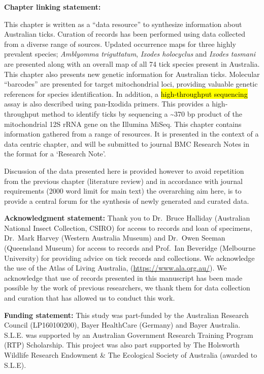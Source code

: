 \documentclass[a4paper, nobind]{templates/ociamthesis}
\begin{document}
\newpage

\textbf{Chapter linking statement:}

This chapter is written as a ``data resource'' to synthesize information about Australian ticks.
Curation of records has been performed using data collected from a diverse range of sources.
Updated occurrence maps for three highly prevalent species; \emph{Amblyomma triguttatum}, \emph{Ixodes holocyclus} and \emph{Ixodes tasmani} are presented along with an overall map of all 74 tick species present in Australia. This chapter also presents new genetic information for Australian ticks.
Molecular ``barcodes'' are presented for target mitochondrial loci, providing valuable genetic references for species identification. In addition, a \hl{high-throughput sequencing} assay is also described using pan-Ixodida primers.
This provides a high-throughput method to identify ticks by sequencing a \textasciitilde370 bp product of the mitochondrial 12S rRNA gene on the Illumina MiSeq.
This chapter contains information gathered from a range of resources.
It is presented in the context of a data centric chapter, and will be submitted to journal BMC Research Notes in the format for a `Research Note'.

Discussion of the data presented here is provided however to avoid repetition from the previous chapter (literature review) and in accordance with journal requirements (2000 word limit for main text) the overarching aim here, is to provide a central forum for the synthesis of newly generated and curated data.

\vspace{5mm}

\textbf{Acknowledgment statement:}
Thank you to Dr.~Bruce Halliday (Australian National Insect Collection, CSIRO) for access to records and loan of specimens, Dr.~Mark Harvey (Western Australia Museum) and Dr.~Owen Seeman (Queensland Museum) for access to records and Prof.~Ian Beveridge (Melbourne University) for providing advice on tick records and collections.
We acknowledge the use of the Atlas of Living Australia, (\url{https://www.ala.org.au/}).
We acknowledge that use of records presented in this manuscript has been made possible by the work of previous researchers, we thank them for data collection and curation that has allowed us to conduct this work.

\vspace{5mm}

\textbf{Funding statement:}
This study was part-funded by the Australian Research Council (LP160100200), Bayer HealthCare (Germany) and Bayer Australia.
S.L.E. was supported by an Australian Government Research Training Program (RTP) Scholarship.
This project was also part supported by The Holsworth Wildlife Research Endowment \& The Ecological Society of Australia (awarded to S.L.E).
\end{document}
